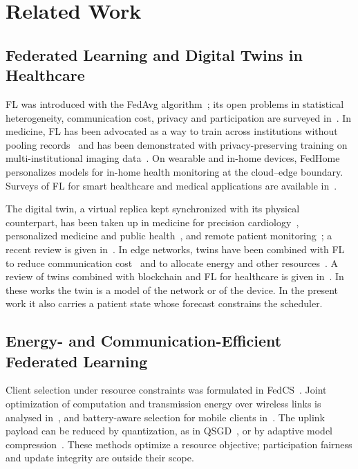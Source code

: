 \section{Related Work}
\label{sec:related}

\subsection{Federated Learning and Digital Twins in Healthcare}
FL was introduced with the FedAvg algorithm~\cite{mcmahan2017communication}; its open problems in statistical heterogeneity, communication cost, privacy and participation are surveyed in~\cite{kairouz2021advances,lu2024noniid}. In medicine, FL has been advocated as a way to train across institutions without pooling records~\cite{rieke2020future} and has been demonstrated with privacy-preserving training on multi-institutional imaging data~\cite{kaissis2021end}. On wearable and in-home devices, FedHome~\cite{wu2022fedhome} personalizes models for in-home health monitoring at the cloud--edge boundary. Surveys of FL for smart healthcare and medical applications are available in~\cite{nguyen2022federated,rauniyar2024federated}.

The digital twin, a virtual replica kept synchronized with its physical counterpart, has been taken up in medicine for precision cardiology~\cite{corral2020digital}, personalized medicine and public health~\cite{kamelboulos2021digital}, and remote patient monitoring~\cite{khan2024implementing}; a recent review is given in~\cite{rudsari2025digital}. In edge networks, twins have been combined with FL to reduce communication cost~\cite{lu2021communication} and to allocate energy and other resources~\cite{zhou2025energy,chu2024resource}. A review of twins combined with blockchain and FL for healthcare is given in~\cite{hemdan2025smart}. In these works the twin is a model of the network or of the device. In the present work it also carries a patient state whose forecast constrains the scheduler.

\subsection{Energy- and Communication-Efficient Federated Learning}
Client selection under resource constraints was formulated in FedCS~\cite{nishio2019client}. Joint optimization of computation and transmission energy over wireless links is analysed in~\cite{tran2019federated,yang2021energy}, and battery-aware selection for mobile clients in~\cite{arouj2022towards}. The uplink payload can be reduced by quantization, as in QSGD~\cite{alistarh2017qsgd}, or by adaptive model compression~\cite{zhu2025adaptcomp}. These methods optimize a resource objective; participation fairness and update integrity are outside their scope.

